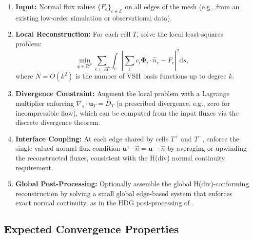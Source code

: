 \begin{enumerate}
  \item \textbf{Input:} Normal flux values $\{F_e\}_{e\in\mathcal{E}}$ on
        all edges of the mesh (e.g., from an existing low-order simulation
        or observational data).
  \item \textbf{Local Reconstruction:} For each cell $T$, solve the local
        least-squares problem:
        \[
          \min_{\mathbf{c}\in\mathbb{R}^N} \sum_{e\subset\partial T}
          \int_e \left|\sum_i c_i\boldsymbol{\Phi}_i\cdot\hat{n}_e
          - F_e\right|^2 \mathrm{d}s,
        \]
        where $N = O(k^2)$ is the number of VSH basis functions up to degree $k$.
  \item \textbf{Divergence Constraint:} Augment the local problem with a
        Lagrange multiplier enforcing $\nabla_s\cdot\mathbf{u}_T =
        \bar{D}_T$ (a prescribed divergence, e.g., zero for incompressible
        flow), which can be computed from the input fluxes via the discrete
        divergence theorem.
  \item \textbf{Interface Coupling:} At each edge shared by cells $T^+$ and
        $T^-$, enforce the single-valued normal flux condition
        $\mathbf{u}^+\cdot\hat{n} = \mathbf{u}^-\cdot\hat{n}$ by averaging
        or upwinding the reconstructed fluxes, consistent with the H(div)
        normal continuity requirement.
  \item \textbf{Global Post-Processing:} Optionally assemble the global
        H(div)-conforming reconstruction by solving a small global
        edge-based system that enforces exact normal continuity, as in the
        HDG post-processing of \cite{cockburnHDG2009}.
\end{enumerate}

\subsection{Expected Convergence Properties}

